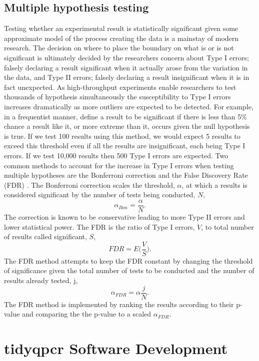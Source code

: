 \documentclass[../main.tex]{subfiles}
\begin{document}
\subsection{Multiple hypothesis testing}

Testing whether an experimental result is statistically significant given some approximate model of the process creating the data is a mainstay of modern research.
The decision on where to place the boundary on what is or is not significant is ultimately decided by the researchers concern about Type I errors; falsely declaring a result significant when it actually arose from the variation in the data, and Type II errors; falsely declaring a result insignificant when it is in fact unexpected.
As high-throughput experiments enable researchers to test thousands of hypothesis simultaneously the susceptibility to Type I errors increases dramatically as more outliers are expected to be detected.
For example, in a frequentist manner, define a result to be significant if there is less than 5\% chance a result like it, or more extreme than it, occurs given the null hypothesis is true.
If we test 100 results using this method, we would expect 5 results to exceed this threshold even if all the results are insignificant, each being Type I errors.
If we test 10,000 results then 500 Type I errors are expected.
Two common methods to account for the increase in Type I errors when testing multiple hypotheses are the Bonferroni correction and the False Discovery Rate (FDR) \parencite{Bonferroni1936, Hochberg1995}.
The Bonferroni correction scales the threshold, $\alpha$, at which a results is considered significant by the number of tests being conducted, $N$,
$$\alpha_{Bon} = \frac{\alpha}{N}.$$
The correction is known to be conservative leading to more Type II errors and lower statistical power.
The FDR is the ratio of Type I errors, $V$, to total number of results called significant, $S$,
$$FDR = E\Big(\frac{V}{S}\Big).$$ 
The FDR method attempts to keep the FDR constant by changing the threshold of significance given the total number of tests to be conducted and the number of results already tested, j,
$$\alpha_{FDR} = \alpha \frac{j}{N}.$$
The FDR method is implemented by ranking the results according to their p-value and comparing the the p-value to a scaled $\alpha_{FDR}$.

\section{tidyqpcr Software Development}
\end{document}
